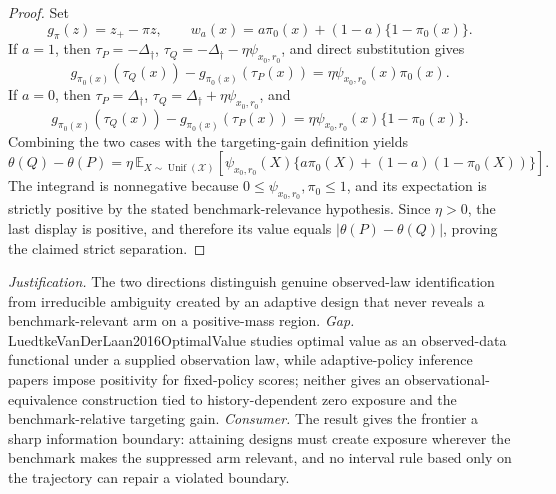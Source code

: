 \documentclass{article}
\begin{document}
\begin{proof}
Set
\[
g_{\pi}(z)=z_+-\pi z,
\qquad
w_a(x)=a\pi_0(x)+(1-a)\{1-\pi_0(x)\}.
\]
If \(a=1\), then
\(\tau_P=-\Delta_\dagger\),
\(\tau_Q=-\Delta_\dagger-\eta\psi_{x_0,r_0}\), and direct substitution gives
\[
g_{\pi_0(x)}(\tau_Q(x))-g_{\pi_0(x)}(\tau_P(x))
=\eta\psi_{x_0,r_0}(x)\pi_0(x).
\]
If \(a=0\), then
\(\tau_P=\Delta_\dagger\),
\(\tau_Q=\Delta_\dagger+\eta\psi_{x_0,r_0}\), and
\[
g_{\pi_0(x)}(\tau_Q(x))-g_{\pi_0(x)}(\tau_P(x))
=\eta\psi_{x_0,r_0}(x)\{1-\pi_0(x)\}.
\]
Combining the two cases with the targeting-gain definition yields
\[
\theta(Q)-\theta(P)
=\eta\,\mathbb E_{X\sim\operatorname{Unif}(\mathcal X)}
 \left[\psi_{x_0,r_0}(X)
 \{a\pi_0(X)+(1-a)(1-\pi_0(X))\}\right].
\]
The integrand is nonnegative because \(0\le\psi_{x_0,r_0},\pi_0\le1\), and its expectation is strictly positive by the stated benchmark-relevance hypothesis.  Since \(\eta>0\), the last display is positive, and therefore its value equals \(|\theta(P)-\theta(Q)|\), proving the claimed strict separation.
\end{proof}
\par\smallskip\noindent \textit{Justification.} The two directions distinguish genuine observed-law identification from irreducible ambiguity created by an adaptive design that never reveals a benchmark-relevant arm on a positive-mass region. \textit{Gap.} LuedtkeVanDerLaan2016OptimalValue studies optimal value as an observed-data functional under a supplied observation law, while adaptive-policy inference papers impose positivity for fixed-policy scores; neither gives an observational-equivalence construction tied to history-dependent zero exposure and the benchmark-relative targeting gain. \textit{Consumer.} The result gives the frontier a sharp information boundary: attaining designs must create exposure wherever the benchmark makes the suppressed arm relevant, and no interval rule based only on the trajectory can repair a violated boundary.
\end{document}
